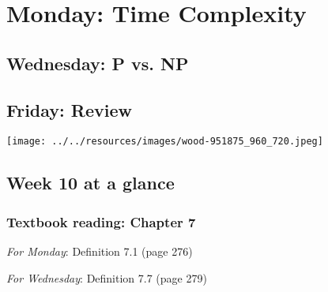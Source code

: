 \newpage


\section*{Monday: Time Complexity}


    
\newpage
\subsection*{Wednesday: P vs. NP}




\newpage
\subsection*{Friday: Review}



\newpage


\begin{center}
\texttt{[image: ../../resources/images/wood-951875\_960\_720.jpeg]}
\end{center}



\subsection*{Week 10 at a glance}

\subsubsection*{Textbook reading: Chapter 7}

{\it For Monday}: Definition 7.1 (page 276)

{\it For Wednesday}: Definition 7.7 (page 279)


